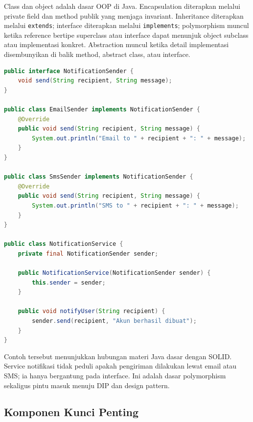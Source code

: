 Class dan object adalah dasar OOP di Java. Encapsulation diterapkan melalui private field dan method publik yang menjaga invariant. Inheritance diterapkan melalui \texttt{extends}; interface diterapkan melalui \texttt{implements}; polymorphism muncul ketika reference bertipe superclass atau interface dapat menunjuk object subclass atau implementasi konkret. Abstraction muncul ketika detail implementasi disembunyikan di balik method, abstract class, atau interface.

\begin{lstlisting}[language=Java, caption={Polymorphism sederhana melalui interface}, label={lst:polymorphism-intro}]
public interface NotificationSender {
    void send(String recipient, String message);
}

public class EmailSender implements NotificationSender {
    @Override
    public void send(String recipient, String message) {
        System.out.println("Email to " + recipient + ": " + message);
    }
}

public class SmsSender implements NotificationSender {
    @Override
    public void send(String recipient, String message) {
        System.out.println("SMS to " + recipient + ": " + message);
    }
}

public class NotificationService {
    private final NotificationSender sender;

    public NotificationService(NotificationSender sender) {
        this.sender = sender;
    }

    public void notifyUser(String recipient) {
        sender.send(recipient, "Akun berhasil dibuat");
    }
}
\end{lstlisting}

Contoh tersebut menunjukkan hubungan materi Java dasar dengan SOLID. Service notifikasi tidak peduli apakah pengiriman dilakukan lewat email atau SMS; ia hanya bergantung pada interface. Ini adalah dasar polymorphism sekaligus pintu masuk menuju DIP dan design pattern.

\subsection{Komponen Kunci Penting}


